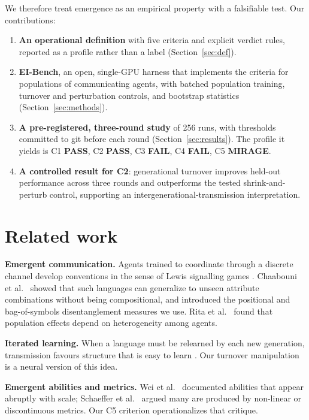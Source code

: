 \documentclass[11pt]{article}
\newcommand{\pass}{\textbf{PASS}}
\newcommand{\fail}{\textbf{FAIL}}
\newcommand{\mirage}{\textbf{MIRAGE}}
\begin{document}
We therefore treat emergence as an empirical property with a falsifiable test. Our contributions:
\begin{enumerate}
  \item \textbf{An operational definition} with five criteria and explicit verdict rules,
        reported as a profile rather than a label (Section~\ref{sec:def}).
  \item \textbf{EI-Bench}, an open, single-GPU harness that implements the criteria for
        populations of communicating agents, with batched population training, turnover and
        perturbation controls, and bootstrap statistics (Section~\ref{sec:methods}).
  \item \textbf{A pre-registered, three-round study} of 256 runs, with thresholds committed to git
        before each round (Section~\ref{sec:results}). The profile it yields is C1 \pass,
        C2 \pass, C3 \fail, C4 \fail, C5 \mirage.
  \item \textbf{A controlled result for C2}: generational turnover improves held-out performance
        across three rounds and outperforms the tested shrink-and-perturb control, supporting an
        intergenerational-transmission interpretation.
\end{enumerate}

\section{Related work}

\textbf{Emergent communication.} Agents trained to coordinate through a discrete channel develop
conventions in the sense of Lewis signalling games \cite{lewis1969}. Chaabouni et al.\
\cite{chaabouni2020} showed that such languages can generalize to unseen attribute combinations
without being compositional, and introduced the positional and bag-of-symbols disentanglement
measures we use. Rita et al.\ \cite{rita2022} found that population effects depend on
heterogeneity among agents.

\textbf{Iterated learning.} When a language must be relearned by each new generation, transmission
favours structure that is easy to learn \cite{kirby2008}. Our turnover manipulation is a neural
version of this idea.

\textbf{Emergent abilities and metrics.} Wei et al.\ \cite{wei2022} documented abilities that
appear abruptly with scale; Schaeffer et al.\ \cite{schaeffer2023} argued many are produced by
non-linear or discontinuous metrics. Our C5 criterion operationalizes that critique.
\end{document}
